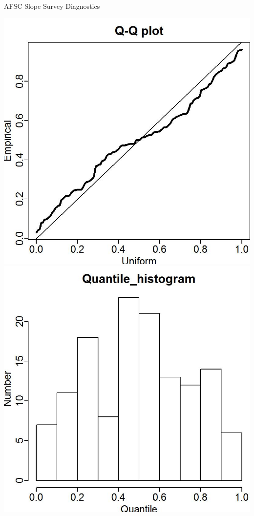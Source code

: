 \documentclass[pdf]{beamer}\usepackage[]{graphicx}\usepackage[]{color}
\begin{document}
\begin{frame}{AFSC Slope Survey Diagnostics}
  \begin{center}
  \includegraphics[scale = 0.50]{figures/AFSC_Q-Q_plot.jpg}
  \includegraphics[scale = 0.50]{figures/AFSC_Q-Q_hist.jpg}
  \end{center}
\end{frame}
\end{document}
